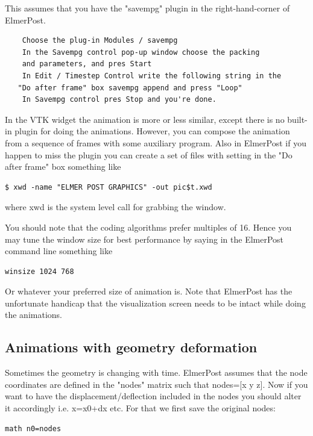 This assumes that you have the "savempg" plugin in the right-hand-corner of ElmerPost.

\begin{verbatim}
    Choose the plug-in Modules / savempg
    In the Savempg control pop-up window choose the packing
    and parameters, and pres Start
    In Edit / Timestep Control write the following string in the
   "Do after frame" box savempg append and press "Loop"
    In Savempg control pres Stop and you're done. 
\end{verbatim}

In the VTK widget the animation is more or less similar, except there is no built-in plugin for doing the animations. However, you can compose the animation from a sequence of frames with some auxiliary program. Also in ElmerPost if you happen to miss the plugin you can create a set of files with setting in the "Do after frame" box something like

\begin{verbatim}
$ xwd -name "ELMER POST GRAPHICS" -out pic$t.xwd
\end{verbatim}

where xwd is the system level call for grabbing the window.

You should note that the coding algorithms prefer multiples of 16. Hence you may tune the window size for best performance by saying in the ElmerPost command line something like

\begin{verbatim}
winsize 1024 768
\end{verbatim}

Or whatever your preferred size of animation is. Note that ElmerPost has the unfortunate handicap that the visualization screen needs to be intact while doing the animations.

\subsection{Animations with geometry deformation}

Sometimes the geometry is changing with time. ElmerPost assumes that the node coordinates are defined in the "nodes" matrix such that nodes=[x y z]. Now if you want to have the displacement/deflection included in the nodes you should alter it accordingly i.e. x=x0+dx etc. For that we first save the original nodes:

\begin{verbatim}
math n0=nodes
\end{verbatim}

